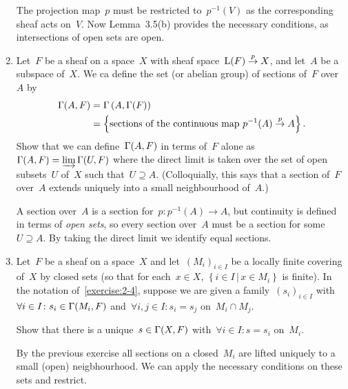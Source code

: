\documentclass[a4paper,11pt,oneside,openany,article]{memoir}
\begin{document}
\begin{enumerate}
    \begin{solution}
      The projection map~$p$ must be restricted to~$p^{-1}(V)$ as the corresponding sheaf acts on~$V$. Now Lemma~3.5(b) provides the necessary conditions, as intersections of open sets are open.
    \end{solution}

  \item\label{exercise:2-4} Let~$F$ be a sheaf on a space~$X$ with sheaf space~$\mathrm{L}(F)\overset{p}{\rightarrow} X$, and let~$A$ be a subspace of~$X$. We ca define the set (or abelian group) of sections of~$F$ over~$A$ by
    \begin{align}
      \mathrm{\Gamma}(A,F)&=\mathrm{\Gamma}\left( A,\mathrm{\Gamma}(F) \right) \\
      &=\left\{ \text{sections of the continuous map $p^{-1}(A)\overset{p}{\rightarrow}A$} \right\}.
    \end{align}
    Show that we can define~$\mathrm{\Gamma}(A,F)$ in terms of~$F$ alone as~$\mathrm{\Gamma}(A,F)=\varinjlim\mathrm{\Gamma}(U,F)$ where the direct limit is taken over the set of open subsets~$U$ of~$X$ such that~$U\supseteq A$. (Colloquially, this says that a section of~$F$ over~$A$ extends uniquely into a small neighbourhood of~$A$.)

    \begin{solution}
      A section over~$A$ is a section for~$p\colon p^{-1}(A)\to A$, but continuity is defined in terms of \emph{open sets}, so every section over~$A$ must be a section for some~$U\supseteq A$. By taking the direct limit we identify equal sections.
    \end{solution}

  \item\label{exercise:2-5} Let~$F$ be a sheaf on a space~$X$ and let~$(M_i)_{i\in I}$ be a locally finite covering of~$X$ by closed sets (so that for each~$x\in X$, $\left\{ i\in I\,|\,x\in M_i \right\}$ is finite). In the notation of~\ref{exercise:2-4}, suppose we are given a family~$(s_i)_{i\in I}$ with~$\forall i\in I\colon s_i\in\mathrm{\Gamma}(M_i,F)$ and~$\forall i,j\in I\colon s_i=s_j$ on~$M_i\cap M_j$.

    Show that there is a unique~$s\in\mathrm{\Gamma}(X,F)$ with~$\forall i\in I\colon s=s_i$ on~$M_i$.

    \begin{solution}
      By the previous exercise all sections on a closed~$M_i$ are lifted uniquely to a small (open) neigbhourhood. We can apply the necessary conditions on these sets and restrict.
    \end{solution}


\end{enumerate}
\end{document}
